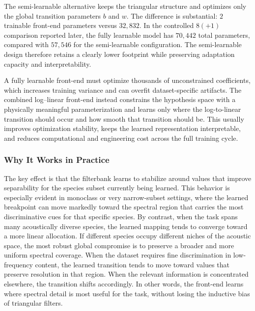 \documentclass[a4paper,singleside,12pt]{report} %
\begin{document}
	The semi-learnable alternative keeps the triangular structure and optimizes only the global transition parameters \(b\) and \(w\). The difference is substantial: \(2\) trainable front-end parameters versus \(32{,}832\). In the controlled \(8(+1)\) comparison reported later, the fully learnable model has \(70{,}442\) total parameters, compared with \(57{,}546\) for the semi-learnable configuration. The semi-learnable design therefore retains a clearly lower footprint while preserving adaptation capacity and interpretability.

	A fully learnable front-end must optimize thousands of unconstrained coefficients, which increases training variance and can overfit dataset-specific artifacts. The combined log--linear front-end instead constrains the hypothesis space with a physically meaningful parameterization and learns only where the log-to-linear transition should occur and how smooth that transition should be. This usually improves optimization stability, keeps the learned representation interpretable, and reduces computational and engineering cost across the full training cycle.

	\subsubsection{Why It Works in Practice}
	The key effect is that the filterbank learns to stabilize around values that improve separability for the species subset currently being learned. This behavior is especially evident in monoclass or very narrow-subset settings, where the learned breakpoint can move markedly toward the spectral region that carries the most discriminative cues for that specific species. By contrast, when the task spans many acoustically diverse species, the learned mapping tends to converge toward a more linear allocation. If different species occupy different niches of the acoustic space, the most robust global compromise is to preserve a broader and more uniform spectral coverage. When the dataset requires fine discrimination in low-frequency content, the learned transition tends to move toward values that preserve resolution in that region. When the relevant information is concentrated elsewhere, the transition shifts accordingly. In other words, the front-end learns where spectral detail is most useful for the task, without losing the inductive bias of triangular filters.
\end{document}
